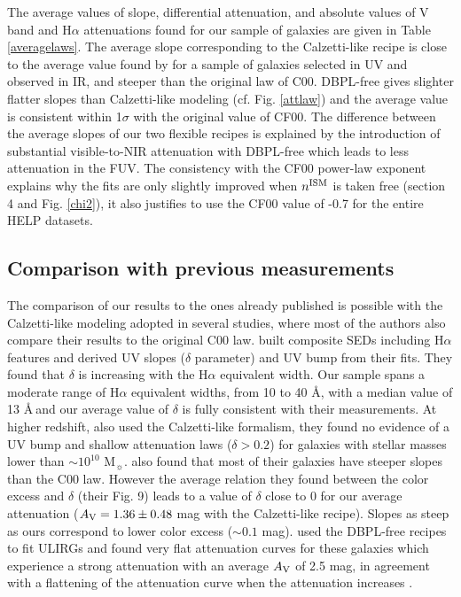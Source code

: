 \documentclass{aa}
\begin{document}
The average values of slope, differential attenuation, and absolute values of V band  and H$\alpha$ attenuations found for our sample of galaxies are given in Table \ref{averagelaws}. The average  slope   corresponding to  the Calzetti-like recipe is close  to the average value found by \citet{Buat12}  for a sample of galaxies selected in UV and observed in IR, and steeper than the original law of C00. DBPL-free  gives  slighter flatter slopes than Calzetti-like modeling (cf. Fig. \ref{attlaw}) and  the average value is consistent within 1$\sigma$ with the original value of CF00. The difference between the average slopes of our two flexible recipes  is explained by the introduction of substantial visible-to-NIR  attenuation with DBPL-free which leads to less attenuation in the FUV. The consistency with the CF00 power-law exponent explains why the fits are only slightly improved when $n^{\rm ISM}$ is taken free (section 4 and Fig. \ref{chi2}), it also justifies to use the CF00 value of -0.7 for the entire HELP datasets.

\subsection{Comparison with previous measurements}
 The comparison of our results to the ones already published is possible with the Calzetti-like modeling adopted in several studies, where most of the authors also compare their results to the original C00 law.   \citet{Kriek13}  built composite SEDs including H$\alpha$ features and derived UV slopes ($\delta$ parameter) and UV bump from their fits. They found that $\delta$ is increasing with the H$\alpha$ equivalent width. Our sample spans a moderate range of H$\alpha$ equivalent widths, from 10 to 40 \AA,   with a median value of 13 \AA$~$and our average value of $\delta$ is fully consistent with their measurements. {At higher redshift, \citet{Zeimann15} also  used the Calzetti-like formalism, they  found no evidence of a UV bump and shallow attenuation laws ($\delta>0.2$) for galaxies with stellar masses lower than $\sim 10^{10}$ M$_{\sun}$.  \citet{Salmon16} also found that most of their galaxies have steeper slopes than the C00 law.  However  the average relation they found between the color excess and $\delta$ (their Fig. 9) leads to a	value of $\delta$ close to 0 for  our average attenuation ($A_{\rm V}=1.36\pm 0.48$ mag with the Calzetti-like recipe).  Slopes as steep as ours  correspond to  lower color excess ($\sim 0.1$ mag)}.  {\citet{LoFaro17} used the DBPL-free recipes to fit ULIRGs and found very flat attenuation curves for  these galaxies which experience  a strong  attenuation with an average $A_{\rm V}$ of 2.5 mag, in agreement with a flattening of the attenuation curve when the attenuation increases \citep{Salmon16}.}
 
\end{document}
